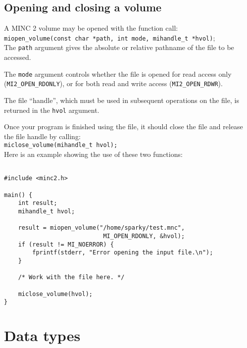 \documentclass{article}
\begin{document}
\subsection{Opening and closing a volume}
A MINC 2 volume may be opened with the function call: \\

{\tt miopen\_volume(const char *path, int mode, mihandle\_t *hvol)}; \\

The {\tt path} argument gives the absolute or relative pathname of the
file to be accessed.

The {\tt mode} argument controls whether the file is opened for read
access only ({\tt MI2\_OPEN\_RDONLY}), or for both read and write access
({\tt MI2\_OPEN\_RDWR}). 

The file ``handle'', which must be used in subsequent operations on the
file, is returned in the {\tt hvol} argument.

Once your program is finished using the file, it should close the file
and release the file handle by calling:\\

{\tt miclose\_volume(mihandle\_t hvol);} \\

Here is an example showing the use of these two functions:

\begin{verbatim}

#include <minc2.h>

main() {
    int result;
    mihandle_t hvol;

    result = miopen_volume("/home/sparky/test.mnc", 
                            MI_OPEN_RDONLY, &hvol);
    if (result != MI_NOERROR) {
        fprintf(stderr, "Error opening the input file.\n");
    }

    /* Work with the file here. */

    miclose_volume(hvol);
}
\end{verbatim}

\newpage
\section{Data types}
\end{document}
